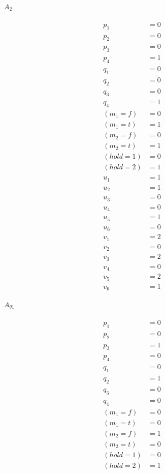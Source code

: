 \documentclass{article}
\begin{document}
\paragraph{$A_2$}

\begin{align*}
  p_1 &= 0 \\
  p_2 &= 0 \\
  p_3 &= 0 \\
  p_4 &= 1 \\
  q_1 &= 0 \\
  q_2 &= 0 \\
  q_3 &= 0 \\
  q_4 &= 1 \\
  (m_1=f) &= 0 \\
  (m_1=t) &= 1 \\
  (m_2=f) &= 0 \\
  (m_2=t) &= 1 \\
  (hold=1) &= 0 \\
  (hold=2) &= 1 \\
  u_1 &= 1 \\
  u_2 &= 1 \\
  u_3 &= 0 \\
  u_4 &= 0 \\
  u_5 &= 1 \\
  u_6 &= 0 \\
  v_1 &= 2 \\
  v_2 &= 0 \\
  v_3 &= 2 \\
  v_4 &= 0 \\
  v_5 &= 2 \\
  v_6 &= 1
\end{align*}

\paragraph{$A_{\theta 1}$}
\begin{align*}
  p_1 &= 0 \\
  p_2 &= 0 \\
  p_3 &= 1 \\
  p_4 &= 0 \\
  q_1 &= 0 \\
  q_2 &= 1 \\
  q_3 &= 0 \\
  q_4 &= 0 \\
  (m_1=f) &= 0 \\
  (m_1=t) &= 0 \\
  (m_2=f) &= 1 \\
  (m_2=t) &= 0 \\
  (hold=1) &= 0 \\
  (hold=2) &= 1
\end{align*}
\end{document}
